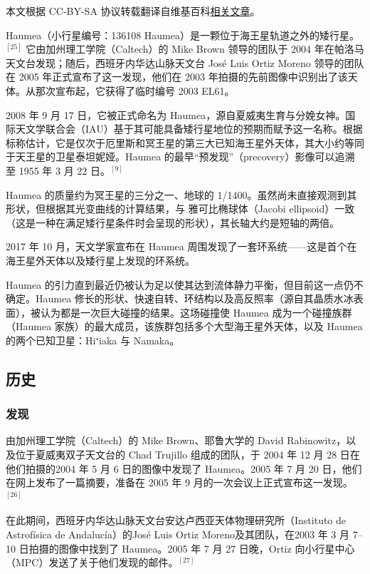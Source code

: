 
本文根据 CC-BY-SA 协议转载翻译自维基百科\href{https://en.wikipedia.org/wiki/Haumea}{相关文章}。

Haumea（小行星编号：136108 Haumea）是一颗位于海王星轨道之外的矮行星。$^{[25]}$
它由加州理工学院（Caltech）的 Mike Brown 领导的团队于 2004 年在帕洛马天文台发现；随后，西班牙内华达山脉天文台 José Luis Ortiz Moreno 领导的团队在 2005 年正式宣布了这一发现，他们在 2003 年拍摄的先前图像中识别出了该天体。从那次宣布起，它获得了临时编号 2003 EL61。

2008 年 9 月 17 日，它被正式命名为 Haumea，源自夏威夷生育与分娩女神。国际天文学联合会（IAU）基于其可能具备矮行星地位的预期而赋予这一名称。根据标称估计，它是仅次于厄里斯和冥王星的第三大已知海王星外天体，其大小约等同于天王星的卫星泰坦妮娅。Haumea 的最早“预发现”（precovery）影像可以追溯至 1955 年 3 月 22 日。$^{[9]}$

Haumea 的质量约为冥王星的三分之一、地球的 1/1400。虽然尚未直接观测到其形状，但根据其光变曲线的计算结果，与 雅可比椭球体（Jacobi ellipsoid）一致（这是一种在满足矮行星条件时会呈现的形状），其长轴大约是短轴的两倍。

2017 年 10 月，天文学家宣布在 Haumea 周围发现了一套环系统——这是首个在海王星外天体以及矮行星上发现的环系统。

Haumea 的引力直到最近仍被认为足以使其达到流体静力平衡，但目前这一点仍不确定。Haumea 修长的形状、快速自转、环结构以及高反照率（源自其晶质水冰表面），被认为都是一次巨大碰撞的结果。这场碰撞使 Haumea 成为一个碰撞族群（Haumea 家族）的最大成员，该族群包括多个大型海王星外天体，以及 Haumea 的两个已知卫星：Hiʻiaka 与 Namaka。
\subsection{历史}
\subsubsection{发现}
由加州理工学院（Caltech）的 Mike Brown、耶鲁大学的 David Rabinowitz，以及位于夏威夷双子天文台的 Chad Trujillo 组成的团队，于 2004 年 12 月 28 日在他们拍摄的2004 年 5 月 6 日的图像中发现了 Haumea。2005 年 7 月 20 日，他们在网上发布了一篇摘要，准备在 2005 年 9 月的一次会议上正式宣布这一发现。$^{[26]}$

在此期间，西班牙内华达山脉天文台安达卢西亚天体物理研究所（Instituto de Astrofísica de Andalucía）的José Luis Ortiz Moreno及其团队，在2003 年 3 月 7–10 日拍摄的图像中找到了 Haumea。2005 年 7 月 27 日晚，Ortiz 向小行星中心（MPC）发送了关于他们发现的邮件。$^{[27]}$

